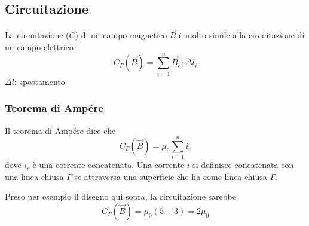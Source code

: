   \subsection{Circuitazione}
  La circuitazione ($C$) di un campo magnetico $\vec{B}$ è molto simile alla circuitazione
  di un campo elettrico
  \begin{equation*}
    C_\Gamma(\vec{B}) = \sum^{n}_{i=1}\vec{B}_i\cdot\Delta l_i
  \end{equation*}
  $\Delta l$: spostamento

  \subsubsection{Teorema di Ampére}
  Il teorema di Ampére dice che
  \begin{equation*}
    C_\Gamma(\vec{B}) = \mu_0 \sum\limits^{n}_{i=1} i_c
  \end{equation*}
  dove $i_c$ è una corrente concatenata. Una corrente $i$ si definisce concatenata con una linea
  chiusa $\Gamma$ se attraversa una superficie che ha come linea chiusa $\Gamma$.

  \begin{center}
  \end{center}

  Preso per esempio il disegno qui sopra, la circuitazione sarebbe
  \begin{equation*}
    C_\Gamma(\vec{B}) = \mu_0(5-3) = 2\mu_0
  \end{equation*}


